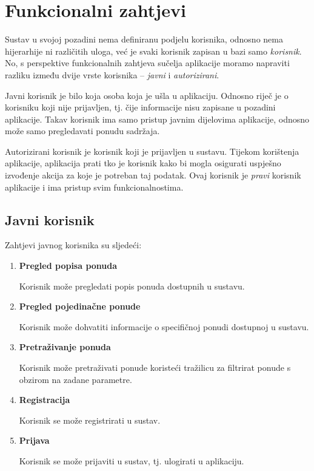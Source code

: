 \documentclass[times, utf8, zavrsni, numeric]{fer}
\newcommand{\razmakp}{\vspace{18pt}}
\newcommand{\razmaks}{\vspace{10pt}}
\newcommand{\uvlakas}{\hspace{0.5cm}}
\begin{document}
\razmakp


\section{Funkcionalni zahtjevi}

Sustav u svojoj pozadini nema definiranu podjelu korisnika, odnosno nema hijerarhije ni različitih uloga, već je svaki korisnik zapisan u bazi samo \emph{korisnik}. No, s perspektive funkcionalnih zahtjeva sučelja aplikacije moramo napraviti razliku između dvije vrste korisnika -- \emph{javni} i \emph{autorizirani}.

Javni korisnik je bilo koja osoba koja je ušla u aplikaciju. Odnosno riječ je o korisniku koji nije prijavljen, tj. čije informacije nisu zapisane u pozadini aplikacije. Takav korisnik ima samo pristup javnim dijelovima aplikacije, odnosno može samo pregledavati ponudu sadržaja. 

Autorizirani korisnik je korisnik koji je prijavljen u sustavu. Tijekom korištenja aplikacije, aplikacija prati tko je korisnik kako bi mogla osigurati uspješno izvođenje akcija za koje je potreban taj podatak. Ovaj korisnik je \emph{pravi} korisnik aplikacije i ima pristup svim funkcionalnostima.

\razmaks


\subsection{Javni korisnik}

Zahtjevi javnog korisnika su sljedeći:

\razmaks
\begin{enumerate} 
  \item \textbf{Pregled popisa ponuda} \par
    \uvlakas Korisnik može pregledati popis ponuda dostupnih u sustavu.

  \item \textbf{Pregled pojedinačne ponude} \par
    \uvlakas Korisnik može dohvatiti informacije o specifičnoj ponudi dostupnoj u sustavu.

  \item \textbf{Pretraživanje ponuda} \par
    \uvlakas Korisnik može pretraživati ponude koristeći tražilicu za filtrirat ponude s obzirom na zadane parametre.

  \item \textbf{Registracija} \par
    \uvlakas Korisnik se može registrirati  u sustav.

  \item \textbf{Prijava} \par
    \uvlakas Korisnik se može prijaviti u sustav, tj. ulogirati  u aplikaciju.

\end{enumerate}
\razmaks
\end{document}
